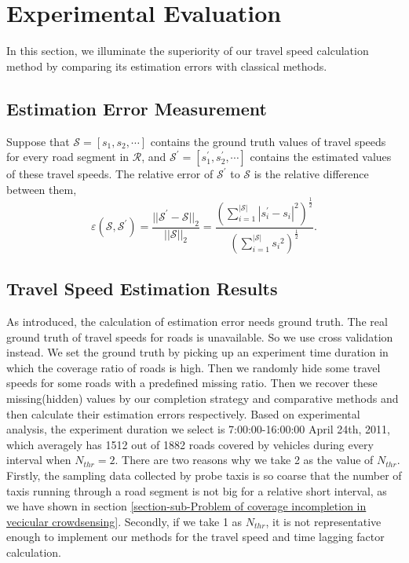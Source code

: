 \documentclass[twocolumn,10pt,final,conference]{IEEEtran}
\begin{document}
\section{Experimental Evaluation}\label{section-Experimental Evaluation}
In this section, we illuminate the superiority of our travel speed calculation method by comparing its estimation errors with classical methods.
\subsection{Estimation Error Measurement}
Suppose that $\mathcal{S}=[s_1, s_2,\cdots ]$ contains the ground truth values of travel speeds for every road segment in $\mathcal{R}$, and $\mathcal{S}^{'}=[s_1^{'}, s_2^{'},\cdots]$ contains the estimated values of these travel speeds. The relative error of $\mathcal{S}^{'}$ to $\mathcal{S}$ is the relative difference between them, \[
 \varepsilon(\mathcal{S}, \mathcal{S}^{'})=\frac{{||\mathcal{S}^{'}-\mathcal{S}||}_{2}}{{||\mathcal{S}||}_{2}}=\frac{{(\sum_{i=1}^{|\mathcal{S}|}{|s_i^{'}-s_i|}^{2})}^{\frac{1}{2}}}{{(\sum_{i=1}^{|\mathcal{S}|}{s_i}^{2})}^{\frac{1}{2}}}.
\]
\subsection{Travel Speed Estimation Results}\label{section-expe-current}
As introduced, the calculation of estimation error needs ground truth. The real ground truth of travel speeds for roads is unavailable. So we use cross validation instead. We set the ground truth by picking up an experiment time duration in which the coverage ratio of roads is high. Then we randomly hide some travel speeds for some roads with a predefined missing ratio. Then we recover these missing(hidden) values by our completion strategy and comparative methods and then calculate their estimation errors respectively. Based on experimental analysis, the experiment duration we select is 7:00:00-16:00:00 April 24th, 2011, which averagely has 1512 out of 1882 roads covered by vehicles during every interval when $N_{thr}=2$. There are two reasons why we take 2 as the value of $N_{thr}$. Firstly, the sampling data collected by probe taxis is so coarse that the number of taxis running through a road segment is not big for a relative short interval, as we have shown in section \ref{section-sub-Problem of coverage incompletion in vecicular crowdsensing}. Secondly, if we take 1 as $N_{thr}$, it is not representative enough to implement our methods for the travel speed and time lagging factor calculation.
\end{document}
